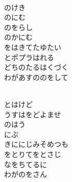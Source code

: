 \documentclass[10pt,b5j]{tarticle} %
\begin{document}
\begin{enumerate}
\begin{minipage}[c]{\blocksize}
    \end{minipage}
    \begin{minipage}[c]{\blocksize}
        
        \vspace{\linespace}
        \item~\\
        のけき\\
        のにむ\\
        のをらし\\
        のかにむ\\
        をはきてたゆたい\\
        とポプラはれる\\
        どちのたるはくづく\\
        わがあすののをして
        
    \end{minipage}
    \begin{minipage}[c]{\blocksize}
        
        \vspace{\linespace}
        \item~\\
        とはけど\\
        うすはをどよませ\\
        のはう\\
        にぶ\\
        きににじみそめつも\\
        をとりてをとさじ\\
        なをちてるに\\
        わがのをさん
    
    \end{minipage}
\end{enumerate} %
\end{document}
